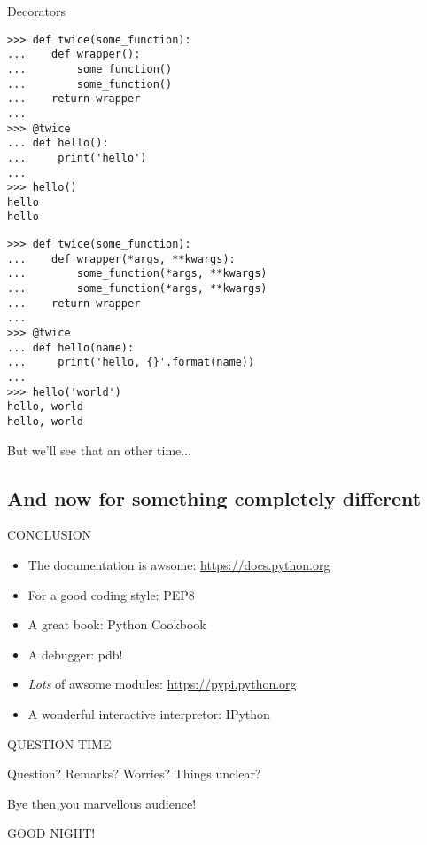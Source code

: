 \documentclass[ignorenonframetext,]{beamer}
\newcommand{\myurl}[1]{\textcolor{blue}{\underline{\url{#1}}}}
\begin{document}
\begin{frame}[fragile]{Decorators}
    \begin{overprint}
    \begin{tcolorbox}
        \begin{verbatim}
>>> def twice(some_function):
...    def wrapper():
...        some_function()
...        some_function()
...    return wrapper
...
>>> @twice
... def hello():
...     print('hello')
...
>>> hello()
hello
hello
        \end{verbatim}
    \end{tcolorbox}

    \begin{tcolorbox}
        \begin{verbatim}
>>> def twice(some_function):
...    def wrapper(*args, **kwargs):
...        some_function(*args, **kwargs)
...        some_function(*args, **kwargs)
...    return wrapper
...
>>> @twice
... def hello(name):
...     print('hello, {}'.format(name))
...
>>> hello('world')
hello, world
hello, world
        \end{verbatim}
    \end{tcolorbox}

    But we'll see that an other time...

    \end{overprint}
\end{frame}

\subsection{And now for something completely different}

\begin{frame}{CONCLUSION}
    \begin{itemize}
        \item The documentation is awsome: \myurl{https://docs.python.org}
        \item For a good coding style: PEP8
        \item A great book: Python Cookbook
        \item A debugger: pdb!
        \item \emph{Lots} of awsome modules: \myurl{https://pypi.python.org}
        \item A wonderful interactive interpretor: IPython
    \end{itemize}
\end{frame}

\begin{frame}{QUESTION TIME}

    Question? Remarks? Worries? Things unclear?

\end{frame}

\begin{frame}{Bye then you marvellous audience!}

    GOOD NIGHT!

\end{frame}
\end{document}
